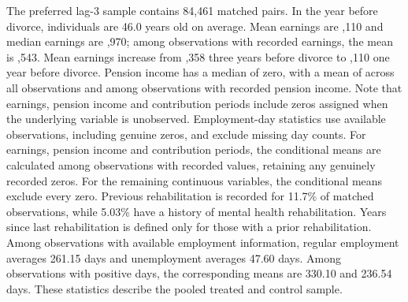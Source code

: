 \documentclass[a4paper,12pt]{article}
\theoremstyle{plain}
\theoremstyle{definition}
\theoremstyle{TheoremNum}
\theoremstyle{CorollaryNum}
\theoremstyle{PropositionNum}
\theoremstyle{TheoremNum}
\begin{document}
The preferred lag-3 sample contains 84,461 matched pairs. In the year before divorce, individuals are 46.0 years old on average. Mean earnings are ,110 and median earnings are ,970; among observations with recorded earnings, the mean is ,543. Mean earnings increase from ,358 three years before divorce to ,110 one year before divorce. Pension income has a median of zero, with a mean of  across all observations and  among observations with recorded pension income. Note that earnings, pension income and contribution periods include zeros assigned when the underlying variable is unobserved. Employment-day statistics use available observations, including genuine zeros, and exclude missing day counts. For earnings, pension income and contribution periods, the conditional means are calculated among observations with recorded values, retaining any genuinely recorded zeros. For the remaining continuous variables, the conditional means exclude every zero. Previous rehabilitation is recorded for 11.7\% of matched observations, while 5.03\% have a history of mental health rehabilitation. Years since last rehabilitation is defined only for those with a prior rehabilitation. Among observations with available employment information, regular employment averages 261.15 days and unemployment averages 47.60 days. Among observations with positive days, the corresponding means are 330.10 and 236.54 days. These statistics describe the pooled treated and control sample.
\end{document}

